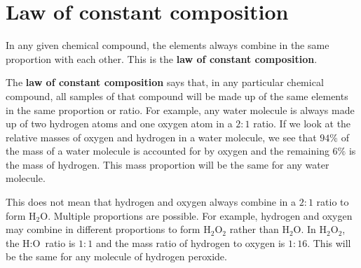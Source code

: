     \label{m38711*cid6}
            \section{Law of constant composition}
            \nopagebreak
      \label{m38711*id65065}In any given chemical compound, the elements always combine in the same proportion with each other. This is the \textbf{law of constant composition}.\par 
      \label{m38711*id65075}The \textbf{law of constant composition} says that, in any particular chemical compound, all samples of that compound will be made up of the same elements in the same proportion or ratio. For example, any water molecule is always made up of two hydrogen atoms and one oxygen atom in a $2:1$ ratio. If we look at the relative masses of oxygen and hydrogen in a water molecule, we see that $94\%$ of the mass of a water molecule is accounted for by oxygen and the remaining $6\%$ is the mass of hydrogen. This mass proportion will be the same for any water molecule.\par 
      \label{m38711*id65089}This does not mean that hydrogen and oxygen always combine in a $2:1$ ratio to form $\text{H}{}_{2}\text{O}$. Multiple proportions are possible. For example, hydrogen and oxygen may combine in different proportions to form $\text{H}{}_{2}\text{O}{}_{2}$ rather than $\text{H}{}_{2}\text{O}$. In $\text{H}{}_{2}\text{O}{}_{2}$, the $\text{H}:\text{O}$ ratio is $1:1$ and the mass ratio of hydrogen to oxygen is $1:16$. This will be the same for any molecule of hydrogen peroxide.\par 
